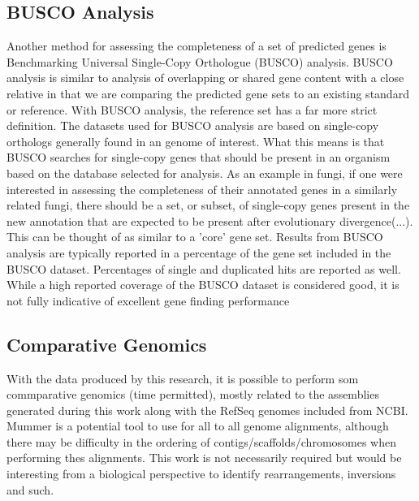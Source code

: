 \subsection{BUSCO Analysis}
Another method for assessing the completeness of a set of predicted
genes is Benchmarking Universal Single-Copy Orthologue (BUSCO)
analysis\cite{10.1093/molbev/msab199}. BUSCO analysis is similar to
analysis of overlapping or shared gene content with a close relative
in that we are comparing the predicted gene sets to an existing
standard or reference. With BUSCO analysis, the reference set has a
far more strict definition. The datasets used for BUSCO analysis are
based on single-copy orthologs generally found in an genome of
interest. What this means is that BUSCO searches for single-copy genes
that should be present in an organism based on the database selected
for analysis. As an example in fungi, if one were interested in
assessing the completeness of their annotated genes in a similarly
related fungi, there should be a set, or subset, of single-copy genes
present in the new annotation that are expected to be present after
evolutionary divergence(...). This can be thought of as similar to a
'core' gene set. Results from BUSCO analysis are typically reported in
a percentage of the gene set included in the BUSCO
dataset. Percentages of single and duplicated hits are reported as
well. While a high reported coverage of the BUSCO dataset is
considered good, it is not fully indicative of excellent gene finding
performance

\subsection{Comparative Genomics}

With the data produced by this research, it is possible to perform som
commparative genomics (time permitted), mostly related to the
assemblies generated during this work along with the RefSeq genomes
included from NCBI. Mummer is a potential tool to use for all to all
genome alignments, although there may be difficulty in the ordering of
contigs/scaffolds/chromosomes when performing thes alignments. This
work is not necessarily required but would be interesting from a
biological perspective to identify rearrangements, inversions and
such.
